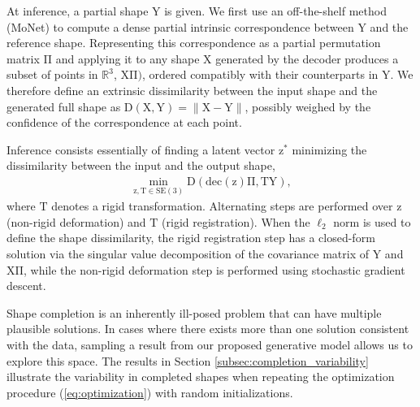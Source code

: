 \documentclass[10pt,twocolumn,letterpaper]{article}
\newcommand{\orlit}[1]{{\color{red}[[orlit: #1]]}}
\newcommand{\bb}[1]{\bm{\mathrm{#1}}}
\begin{document}
At inference, a partial shape $\bb{Y}$ is given. We first use an off-the-shelf method (MoNet) \cite{monet} to compute a dense  partial intrinsic correspondence between $\bb{Y}$ and the reference shape. Representing this correspondence as a partial permutation matrix $\bb{\Pi}$ and applying it to any shape $\bb{X}$ generated by the decoder produces a subset of points in $\mathbb{R}^3$, $\bb{X} \bb{\Pi} )$, ordered compatibly with their counterparts in $\bb{Y}$. 
%
We therefore define an extrinsic dissimilarity between the input shape and the generated full shape as
$\mathrm{D}(\bb{X},\bb{Y}) =  \| \bb{X} - \bb{Y} \|$, possibly weighed by the confidence of the correspondence at each point. 

Inference consists essentially of finding a latent vector $\bb{z}^\ast$ minimizing the dissimilarity between the input and the output shape,
\begin{eqnarray}
\min_{\bb{z}, \bb{T} \in \mathrm{SE}(3)} \mathrm{D}(\mathrm{dec}(\bb{z}) \bb{\Pi}, \bb{T} \bb{Y} ),
\label{eq:optimization}
\end{eqnarray}
where $\bb{T}$ denotes a rigid transformation. Alternating steps are performed over $\bb{z}$ (non-rigid deformation) and $\bb{T}$ (rigid registration). When the $\ell_2$ norm is used to define the shape dissimilarity, the rigid registration step has a closed-form solution via the singular value decomposition of the covariance matrix of $\bb{Y}$ and $\bb{X}\bb{\Pi}$, while the non-rigid deformation step is performed using stochastic gradient descent.

Shape completion is an inherently ill-posed problem that can have multiple plausible solutions. In cases where there exists more than one solution consistent with the data, sampling a result from our proposed generative model allows us to explore this space. The results in Section \ref{subsec:completion_variability} illustrate the variability in completed shapes when repeating the optimization procedure (\ref{eq:optimization}) with random initializations.
\end{document}
